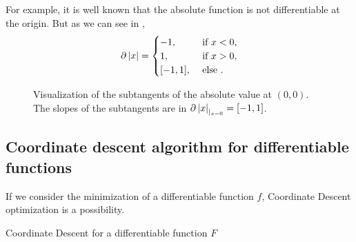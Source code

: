 \documentclass[../main.tex]{subfiles}
\begin{document}
For example, it is well known that the absolute function is not differentiable
at the origin. But as we can see in ,
\[\partial \left \vert x \right \vert =
\begin{cases}
	-1, & \text{ if } x <0, \\
	1, & \text{ if }x>0, \\
	[-1, 1],& \text{ else }. \end{cases}
\]

\begin{figure}[h]
	\centering
{}
\caption{Visualization of the subtangents of the absolute value at $(0,0)$.
The slopes of the subtangents are in $\partial \left \vert x \right \vert_{|_{x=0}}=[-1,1]$.}
\label{fig:subgrad_abs}
\end{figure}

\subsection{Coordinate descent algorithm for differentiable functions}

If we consider the minimization of a differentiable function $f$,
Coordinate Descent optimization is a possibility.

\begin{algorithm}[H]
	\caption{Coordinate Descent for a differentiable function $F$}

	\label{algo:Algo_CD}
\end{algorithm}
\end{document}
